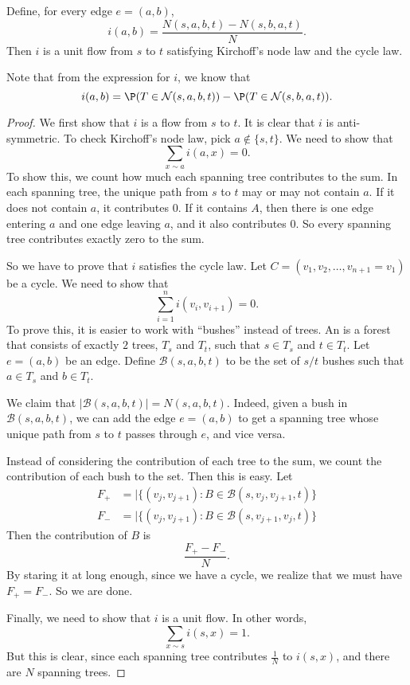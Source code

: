 \documentclass[a4paper]{article}
\begin{document}
\begin{thm}
  Define, for every edge $e = (a, b)$,
  \[
    i(a, b) = \frac{N(s, a, b, t) - N(s, b, a, t)}{N}.
  \]
  Then $i$ is a unit flow from $s$ to $t$ satisfying Kirchoff's node law and the cycle law.
\end{thm}
Note that from the expression for $i$, we know that
\[
  i(a, b) = \P(T \in \mathcal{N}(s, a, b, t)) - \P(T \in \mathcal{N}(s, b, a, t)).
\]
\begin{proof}
  We first show that $i$ is a flow from $s$ to $t$. It is clear that $i$ is anti-symmetric. To check Kirchoff's node law, pick $a \not \in \{s, t\}$. We need to show that
  \[
    \sum_{x \sim a} i(a, x) = 0.
  \]
  To show this, we count how much each spanning tree contributes to the sum. In each spanning tree, the unique path from $s$ to $t$ may or may not contain $a$. If it does not contain $a$, it contributes $0$. If it contains $A$, then there is one edge entering $a$ and one edge leaving $a$, and it also contributes $0$. So every spanning tree contributes exactly zero to the sum.

  So we have to prove that $i$ satisfies the cycle law. Let $C = (v_1, v_2, \ldots, v_{n + 1} = v_1)$ be a cycle. We need to show that
  \[
    \sum_{i = 1}^n i(v_i, v_{i + 1}) = 0.
  \]
  To prove this, it is easier to work with ``bushes'' instead of trees. An  is a forest that consists of exactly $2$ trees, $T_s$ and $T_t$, such that $s \in T_s$ and $t \in T_t$. Let $e = (a, b)$ be an edge. Define $\mathcal{B}(s, a, b, t)$ to be the set of $s/t$ bushes such that $a \in T_s$ and $b \in T_t$.

  We claim that $|\mathcal{B}(s, a, b, t)| = N(s, a, b, t)$. Indeed, given a bush in $\mathcal{B}(s, a, b, t)$, we can add the edge $e = (a, b)$ to get a spanning tree whose unique path from $s$ to $t$ passes through $e$, and vice versa.

  Instead of considering the contribution of each tree to the sum, we count the contribution of each bush to the set. Then this is easy. Let
  \begin{align*}
    F_+ &= |\{(v_j, v_{j + 1}): B \in \mathcal{B}(s, v_j, v_{j + 1}, t)\}\\
    F_- &= |\{(v_j, v_{j + 1}): B \in \mathcal{B}(s, v_{j + 1}, v_j, t)\}
  \end{align*}
  Then the contribution of $B$ is
  \[
    \frac{F_+ - F_-}{N}.
  \]
  By staring it at long enough, since we have a cycle, we realize that we must have $F_+ = F_-$. So we are done.

  Finally, we need to show that $i$ is a unit flow. In other words,
  \[
    \sum_{x \sim s} i(s, x) = 1.
  \]
  But this is clear, since each spanning tree contributes $\frac{1}{N}$ to $i(s, x)$, and there are $N$ spanning trees.
\end{proof}
\end{document}
